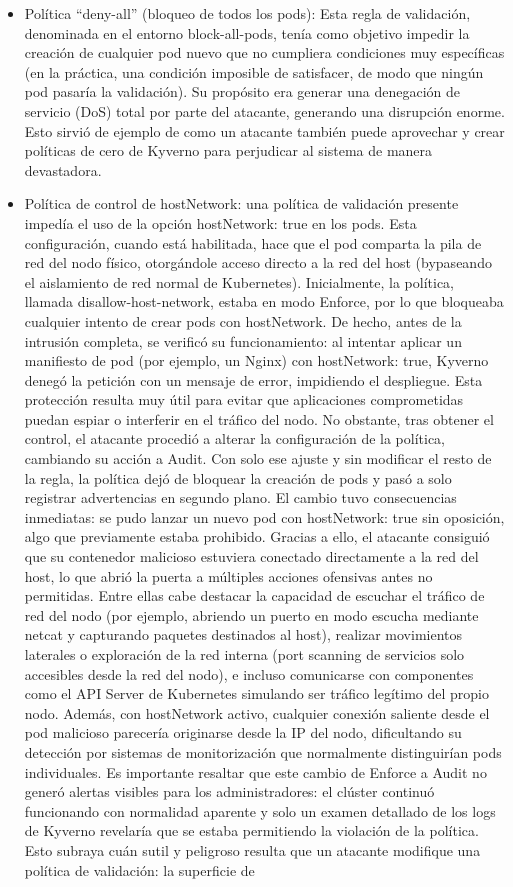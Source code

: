 \documentclass[12pt,twoside,titlepage]{report}
\begin{document}
\begin{itemize}
    \item Política “deny-all” (bloqueo de todos los pods): Esta regla de validación, denominada en el entorno block-all-pods, tenía como objetivo impedir la creación de cualquier pod nuevo que no cumpliera condiciones muy específicas (en la práctica, una condición imposible de satisfacer, de modo que ningún pod pasaría la validación). Su propósito era generar una denegación de servicio (DoS) total por parte del atacante, generando una disrupción enorme. Esto sirvió de ejemplo de como un atacante también puede aprovechar y crear políticas de cero de Kyverno para perjudicar al sistema de manera devastadora.
    \item Política de control de hostNetwork: una política de validación presente impedía el uso de la opción hostNetwork: true en los pods. Esta configuración, cuando está habilitada, hace que el pod comparta la pila de red del nodo físico, otorgándole acceso directo a la red del host (bypaseando el aislamiento de red normal de Kubernetes). Inicialmente, la política, llamada disallow-host-network, estaba en modo Enforce, por lo que bloqueaba cualquier intento de crear pods con hostNetwork. De hecho, antes de la intrusión completa, se verificó su funcionamiento: al intentar aplicar un manifiesto de pod (por ejemplo, un Nginx) con hostNetwork: true, Kyverno denegó la petición con un mensaje de error, impidiendo el despliegue. Esta protección resulta muy útil para evitar que aplicaciones comprometidas puedan espiar o interferir en el tráfico del nodo. No obstante, tras obtener el control, el atacante procedió a alterar la configuración de la política, cambiando su acción a Audit. Con solo ese ajuste y sin modificar el resto de la regla, la política dejó de bloquear la creación de pods y pasó a solo registrar advertencias en segundo plano. El cambio tuvo consecuencias inmediatas: se pudo lanzar un nuevo pod con hostNetwork: true sin oposición, algo que previamente estaba prohibido. Gracias a ello, el atacante consiguió que su contenedor malicioso estuviera conectado directamente a la red del host, lo que abrió la puerta a múltiples acciones ofensivas antes no permitidas. Entre ellas cabe destacar la capacidad de escuchar el tráfico de red del nodo (por ejemplo, abriendo un puerto en modo escucha mediante netcat y capturando paquetes destinados al host), realizar movimientos laterales o exploración de la red interna (port scanning de servicios solo accesibles desde la red del nodo), e incluso comunicarse con componentes como el API Server de Kubernetes simulando ser tráfico legítimo del propio nodo. Además, con hostNetwork activo, cualquier conexión saliente desde el pod malicioso parecería originarse desde la IP del nodo, dificultando su detección por sistemas de monitorización que normalmente distinguirían pods individuales. Es importante resaltar que este cambio de Enforce a Audit no generó alertas visibles para los administradores: el clúster continuó funcionando con normalidad aparente y solo un examen detallado de los logs de Kyverno revelaría que se estaba permitiendo la violación de la política. Esto subraya cuán sutil y peligroso resulta que un atacante modifique una política de validación: la superficie de 
\end{itemize}
\end{document}
